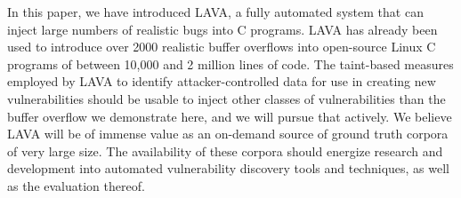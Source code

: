 In this paper, we have introduced LAVA, a fully automated system that can inject large numbers of realistic bugs into C programs.
LAVA has already been used to introduce over 2000 realistic buffer overflows into open-source Linux C programs of between 10,000 and 2 million lines of code.  
The taint-based measures employed by LAVA to identify attacker-controlled data for use in creating new vulnerabilities should be usable to inject other classes of vulnerabilities than the buffer overflow we demonstrate here, and we will pursue that actively.  
We believe LAVA will be of immense value as an on-demand source of ground truth corpora of very large size.
The availability of these corpora should energize research and development into automated vulnerability discovery tools and techniques, as well as the evaluation thereof.



